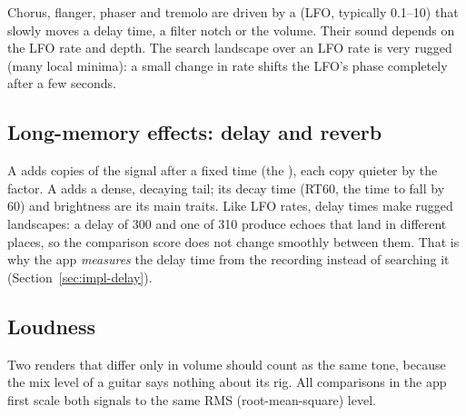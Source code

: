 Chorus, flanger, phaser and tremolo are driven by a  (LFO, typically 0.1--10\Hz) that slowly moves a delay time, a
filter notch or the volume. Their sound depends on the LFO rate and depth. The
search landscape over an LFO rate is very rugged (many local minima): a small
change in rate shifts the LFO's phase completely after a few seconds.

\subsection{Long-memory effects: delay and reverb}

A  adds copies of the signal after a fixed time (the ), each copy quieter by the  factor. A  adds a
dense, decaying tail; its decay time (RT60, the time to fall by 60\dB) and
brightness are its main traits. Like LFO rates, delay times make rugged
landscapes: a delay of 300\ms{} and one of 310\ms{} produce echoes that land in
different places, so the comparison score does not change smoothly between
them. That is why the app \emph{measures} the delay time from the recording
instead of searching it (Section~\ref{sec:impl-delay}).

\subsection{Loudness}

Two renders that differ only in volume should count as the same tone, because
the mix level of a guitar says nothing about its rig. All comparisons in the app
first scale both signals to the same RMS (root-mean-square) level.
